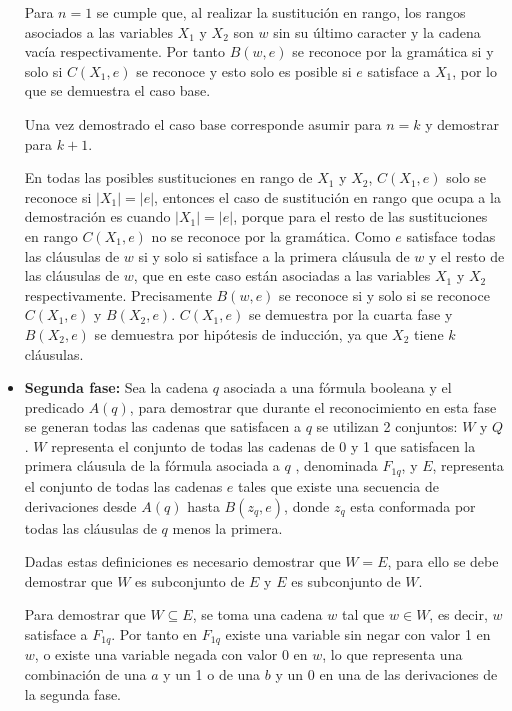 \begin{itemize}
          Para $n=1$ se cumple que, al realizar la sustitución en rango, los rangos asociados a las variables $X_1$ y $X_2$ son $w$ sin su último caracter y la cadena
          vacía respectivamente. Por tanto $B(w,e)$ se reconoce por la gramática si y solo si $C(X_1,e)$ se reconoce y
          esto solo es posible si $e$ satisface a $X_1$, por lo que se demuestra el caso base.

          Una vez demostrado el caso base corresponde asumir para $n=k$ y demostrar para $k+1$.

          En todas las posibles sustituciones en rango de $X_1$ y $X_2$, $C(X_1,e)$ solo se reconoce si $|X_1|=|e|$, entonces el caso de sustitución en rango que ocupa a la demostración
          es cuando $|X_1|=|e|$, porque para el resto de las sustituciones en rango $C(X_1,e)$ no se reconoce por la gramática.
          Como $e$ satisface todas las cláusulas de $w$ si y solo si satisface a la primera cláusula de $w$ y el resto de las cláusulas de $w$, que en este caso
          están asociadas a las variables $X_1$ y $X_2$ respectivamente. Precisamente $B(w,e)$ se reconoce si y solo si se reconoce $C(X_1,e)$ y $B(X_2,e)$. $C(X_1,e)$ se demuestra por la cuarta fase y $B(X_2,e)$ se demuestra por hipótesis de inducción, ya que $X_2$ tiene $k$ cláusulas.

    \item \textbf{Segunda fase:} Sea la cadena $q$ asociada a una fórmula booleana y el predicado $A(q)$, para
          demostrar que durante el reconocimiento en esta fase se generan todas las cadenas que satisfacen a $q$ se
          utilizan 2 conjuntos: $W$ y $Q$. $W$ representa el conjunto de todas las cadenas de 0 y 1 que satisfacen la
          primera cláusula de la fórmula asociada a $q$ , denominada $F_{1q}$, y $E$, representa el conjunto de todas
          las cadenas $e$ tales que existe una secuencia de derivaciones desde $A(q)$ hasta $B(z_q,e)$, donde $z_q$
          esta conformada por todas las cláusulas de $q$ menos la primera.

          Dadas estas definiciones es necesario demostrar que $W=E$, para ello se debe demostrar que $W$ es subconjunto de $E$ y $E$ es subconjunto de $W$.

          Para demostrar que $W\subseteq E$, se toma una cadena $w$ tal que $w\in W$, es decir, $w$ satisface a $F_{1q}$. Por tanto en $F_{1q}$ existe una variable sin negar con valor 1 en $w$, o existe una variable negada con valor 0 en $w$, lo que representa una combinación de una $a$ y un 1 o de una $b$ y un 0 en una de las derivaciones de la segunda fase.


\end{itemize}

